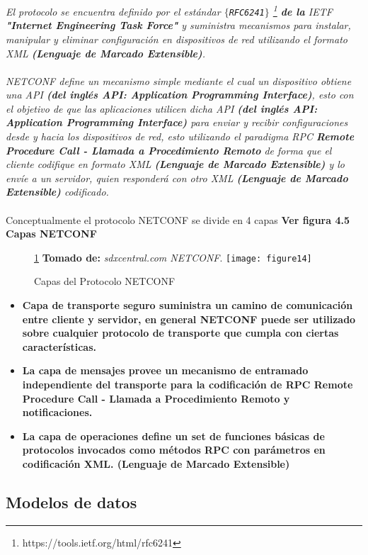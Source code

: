 \textit{El protocolo se encuentra definido por el estándar \texttt{$\{$RFC6241$\}$} 
\footnote{https://tools.ietf.org/html/rfc6241} \textbf{de la}  IETF \textbf{"Internet Engineering Task Force"} y suministra mecanismos para instalar, manipular y eliminar configuración en dispositivos de red utilizando el formato XML \textbf{ (Lenguaje de Marcado Extensible)}.
\\
\\
NETCONF define un mecanismo simple mediante el cual un dispositivo obtiene una API \textbf{(del inglés API: Application Programming Interface)}, esto con el objetivo de que las aplicaciones utilicen dicha API \textbf{(del inglés API: Application Programming Interface)} para enviar y recibir configuraciones desde y hacia los dispositivos de red, esto utilizando el paradigma RPC \textbf{Remote Procedure Call - Llamada a Procedimiento Remoto} de forma que el cliente codifique en formato XML \textbf{(Lenguaje de Marcado Extensible)} y lo envíe a un servidor, quien responderá con otro XML \textbf{ (Lenguaje de Marcado Extensible)} codificado.}
\\
\\
Conceptualmente el protocolo NETCONF se divide en 4 capas \textbf{Ver figura 4.5 Capas NETCONF}
\begin{figure}[htbp]
 \ref{fig:netconf} \textbf{Tomado de:} \textit{sdxcentral.com NETCONF}.
  \centering
    {\texttt{[image: figure14]}}
  \caption{\footnotesize{Capas del Protocolo NETCONF}}
  \label{fig:netconf}
\end{figure}

\begin{itemize}
\item\textbf{Capa de transporte seguro suministra un camino de comunicación entre cliente y servidor, en general NETCONF puede ser utilizado sobre cualquier protocolo de transporte que cumpla con ciertas características.
}
\item\textbf{La capa de mensajes provee un mecanismo de entramado independiente del transporte para la codificación de RPC \textbf{Remote Procedure Call - Llamada a Procedimiento Remoto} y notificaciones.}
\item\textbf{La capa de operaciones define un set de funciones básicas de protocolos invocados como métodos RPC con parámetros en codificación XML. \textbf{(Lenguaje de Marcado Extensible)}}
\end{itemize}


\subsection{Modelos de datos}
\label{sec:Modelos de datos}

